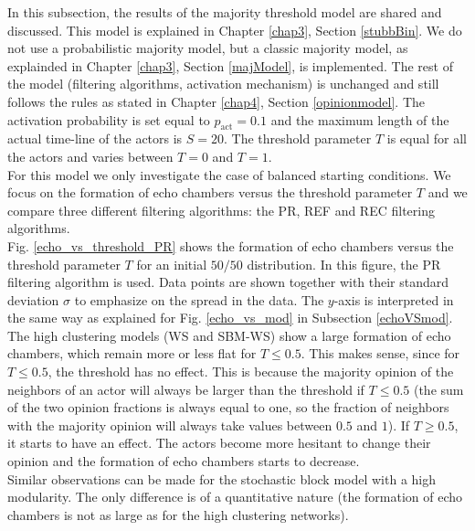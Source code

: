 \documentclass[11 pt , letterpaper , twoside , openright]{book}
\begin{document}
In this subsection, the results of the majority threshold model are shared and discussed. This model is explained in Chapter \ref{chap3}, Section \ref{stubbBin}. We do not use a probabilistic majority model, but a classic majority model, as explainded in Chapter \ref{chap3}, Section \ref{majModel}, is implemented. The rest of the model (filtering algorithms, activation mechanism) is unchanged and still follows the rules as stated in Chapter \ref{chap4}, Section \ref{opinionmodel}. The activation probability is set equal to $p_{\text{act}} = 0.1$ and the maximum length of the actual time-line of the actors is $S=20$. The threshold parameter $T$ is equal for all the actors and varies between $T=0$ and $T=1$.\\
\newline
For this model we only investigate the case of balanced starting conditions. We focus on the formation of echo chambers versus the threshold parameter $T$ and we compare three different filtering algorithms: the PR, REF and REC filtering algorithms. \\
\newline
Fig. \ref{echo_vs_threshold_PR} shows the formation of echo chambers versus the threshold parameter $T$ for an initial $50/50$ distribution. In this figure, the PR filtering algorithm is used. Data points are shown together with their standard deviation $\sigma$ to emphasize on the spread in the data. The $y$-axis is interpreted in the same way as explained for Fig. \ref{echo_vs_mod} in Subsection \ref{echoVSmod}.\\
\newline
The high clustering models (WS and SBM-WS) show a large formation of echo chambers, which remain more or less flat for $T \leqslant 0.5$. This makes sense, since for $T \leqslant 0.5$, the threshold has no effect. This is because the majority opinion of the neighbors of an actor will always be larger than the threshold if $T \leqslant 0.5$ (the sum of the two opinion fractions is always equal to one, so the fraction of neighbors with the majority opinion will always take values between $0.5$ and $1$). If $T \geqslant 0.5$, it starts to have an effect. The actors become more hesitant to change their opinion and the formation of echo chambers starts to decrease.\\
\newline
Similar observations can be made for the stochastic block model with a high modularity. The only difference is of a quantitative nature (the formation of echo chambers is not as large as for the high clustering networks).\\
\end{document}
